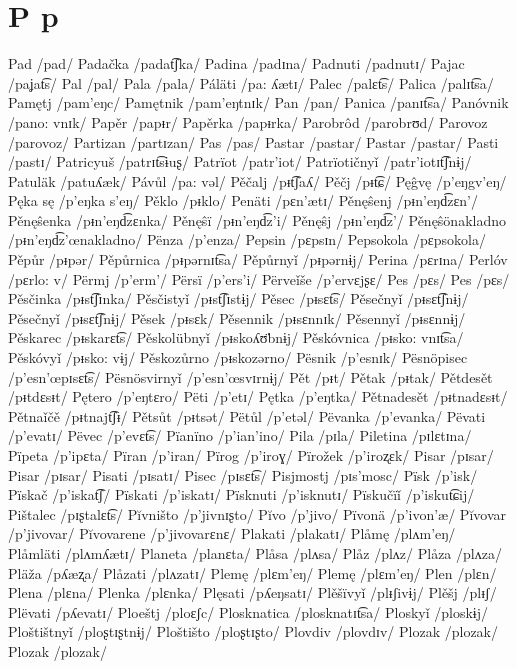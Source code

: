 \chapter{P p}

Pad /pad/
Padačka /padat͡ʃka/
Padina /padɪna/
Padnuti /padnutɪ/
Pajac /paʝat͡s/
Pal /pal/
Pala /pala/
Páläti /pa: ʎætɪ/
Palec /palɛt͡s/
Palica /palɪt͡sa/
Pamętj /pam’eŋc/
Pamętnik /pam’eŋtnɪk/
Pan /pan/
Panica /panɪt͡sa/
Panóvnik /pano: vnɪk/
Papěr /papᵻr/
Papěrka /papᵻrka/
Parobrôd /parobrʊd/
Parovoz /parovoz/
Partizan /partɪzan/
Pas /pas/
Pastar /pastar/
Pastar /pastar/
Pasti /pastɪ/
Patricyuš /patrɪt͡sɨuʂ/
Patrïot /patr’iot/
Patrïotičnyǐ /patr’iotɪt͡ʃnɨj/
Patuläk /patuʎæk/
Pávůl /pa: vəl/
Pěčalj /pᵻt͡ʃaʎ/
Pěčj /pᵻt͡ɕ/
Pęĝvę /p’eŋgv’eŋ/
Pęka sę /p’eŋka s’eŋ/
Pěklo /pᵻklo/
Penäti /pɛn’ætɪ/
Pěnęŝenj /pᵻn’eŋd͡zɛn’/
Pěnęŝenka /pᵻn’eŋd͡zɛnka/
Pěnęŝï /pᵻn’eŋd͡z’i/
Pěnęŝj /pᵻn’eŋd͡z’/
Pěnęŝönakladno /pᵻn’eŋd͡z’œnakladno/
Pënza /p’enza/
Pepsin /pɛpsɪn/
Pepsokola /pɛpsokola/
Pěpůr /pᵻpər/
Pěpůrnica /pᵻpərnɪt͡sa/
Pěpůrnyǐ /pᵻpərnɨj/
Perina /pɛrɪna/
Perlóv /pɛrlo: v/
Përmj /p’erm’/
Përsï /p’ers’i/
Përveǐše /p’ervɛjʂɛ/
Pes /pɛs/
Pes /pɛs/
Pěsčinka /pᵻst͡ʃɪnka/
Pěsčistyǐ /pᵻst͡ʃɪstɨj/
Pěsec /pᵻsɛt͡s/
Pěsečnyǐ /pᵻsɛt͡ʃnɨj/
Pěsečnyǐ /pᵻsɛt͡ʃnɨj/
Pěsek /pᵻsɛk/
Pěsennik /pᵻsɛnnɪk/
Pěsennyǐ /pᵻsɛnnɨj/
Pěskarec /pᵻskarɛt͡s/
Pěskolübnyǐ /pᵻskoʎʊ̈bnɨj/
Pěskóvnica /pᵻsko: vnɪt͡sa/
Pěskóvyǐ /pᵻsko: vɨj/
Pěskozůrno /pᵻskozərno/
Pësnik /p’esnɪk/
Pësnöpisec /p’esn’œpɪsɛt͡s/
Pësnösvirnyǐ /p’esn’œsvɪrnɨj/
Pět /pᵻt/
Pětak /pᵻtak/
Pětdesět /pᵻtdɛsᵻt/
Pętero /p’eŋtɛro/
Pëti /p’etɪ/
Pętka /p’eŋtka/
Pětnadesět /pᵻtnadɛsᵻt/
Pětnaǐčě /pᵻtnajt͡ʃᵻ/
Pětsůt /pᵻtsət/
Pëtůl /p’etəl/
Pëvanka /p’evanka/
Pëvati /p’evatɪ/
Pëvec /p’evɛt͡s/
Pïanïno /p’ian’ino/
Pila /pɪla/
Piletina /pɪlɛtɪna/
Pïpeta /p’ipɛta/
Pïran /p’iran/
Pïrog /p’iroɣ/
Pïrožek /p’iroʐɛk/
Pisar /pɪsar/
Pisar /pɪsar/
Pisati /pɪsatɪ/
Pisec /pɪsɛt͡s/
Pisjmostj /pɪs’mosc/
Pïsk /p’isk/
Pïskač /p’iskat͡ʃ/
Pïskati /p’iskatɪ/
Pïsknuti /p’isknutɪ/
Pïskučïǐ /p’iskut͡ɕij/
Pištalec /pɪʂtalɛt͡s/
Pĭvništo /p’jivnɪʂto/
Pĭvo /p’jivo/
Pïvonä /p’ivon’æ/
Pĭvovar /p’jivovar/
Pĭvovarene /p’jivovarɛnɛ/
Plakati /plakatɪ/
Plåmę /plʌm’eŋ/
Plåmläti /plʌmʎætɪ/
Planeta /planɛta/
Plåsa /plʌsa/
Plåz /plʌz/
Plåza /plʌza/
Pläža /pʎæʐa/
Plåzati /plʌzatɪ/
Plemę /plɛm’eŋ/
Plemę /plɛm’eŋ/
Plen /plɛn/
Plena /plɛna/
Plenka /plɛnka/
Plęsati /pʎeŋsatɪ/
Plěšïvyǐ /plᵻʃivɨj/
Plěšj /plᵻʃ/
Plëvati /pʎevatɪ/
Ploeštj /ploɛʃc/
Plosknatica /plosknatɪt͡sa/
Ploskyǐ /ploskɨj/
Ploštištnyǐ /ploʂtɪʂtnɨj/
Ploštišto /ploʂtɪʂto/
Plovdiv /plovdɪv/
Plozak /plozak/
Plozak /plozak/
